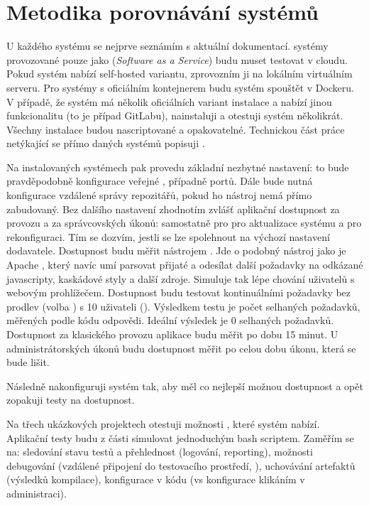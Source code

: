 \section{Metodika porovnávání \CICD systémů}
    U každého systému se nejprve seznámím s aktuální dokumentací. \CICD systémy provozované pouze jako  (\textit{Software as a Service}) budu muset testovat v cloudu. Pokud systém nabízí self-hosted variantu, zprovozním ji na lokálním virtuálním serveru. Pro systémy s oficiálním kontejnerem budu systém spouštět v Dockeru. V případě, že systém má několik oficiálních variant instalace a nabízí jinou funkcionalitu (to je případ GitLabu), nainstaluji a otestuji systém několikrát. Všechny instalace budou nascriptované a opakovatelné. Technickou část práce netýkající se přímo daných \CICD systémů popisuji .

    Na instalovaných systémech pak provedu základní nezbytné nastavení: to bude pravděpodobně konfigurace veřejné , případně portů. Dále bude nutná konfigurace vzdálené správy repozitářů, pokud ho \CICD nástroj nemá přímo zabudovaný. Bez dalšího nastavení zhodnotím zvlášť aplikační dostupnost za provozu a za správcovských úkonů: samostatně pro pro aktualizace \CI systému a pro rekonfiguraci. Tím se dozvím, jestli se lze spolehnout na výchozí nastavení dodavatele. Dostupnost budu měřit nástrojem  \cite{fulmer-siege}. Jde o podobný nástroj jako je Apache  \cite{apache-ab}, který navíc umí parsovat přijaté  a odesílat další požadavky na odkázané javascripty, kaskádové styly a další zdroje. Simuluje tak lépe chování uživatelů s webovým prohlížečem. Dostupnost budu testovat kontinuálními požadavky bez prodlev (volba ) s 10 uživateli (). Výsledkem testu je počet selhaných požadavků, měřených podle \HTTP kódu odpovědi. Ideální výsledek je 0 selhaných požadavků. Dostupnost za klasického provozu aplikace budu měřit po dobu 15 minut. U administrátorských úkonů budu dostupnost měřit po celou dobu úkonu, která se bude lišit.

    Následně nakonfiguruji systém tak, aby měl co nejlepší možnou dostupnost a opět zopakuji testy na dostupnost.

    Na třech ukázkových projektech otestuji možnosti \CI, které systém nabízí. Aplikační testy budu z části simulovat jednoduchým bash scriptem.  Zaměřím se na: sledování stavu testů a přehlednost (logování, reporting), možnosti debugování (vzdálené připojení do testovacího prostředí, ), uchovávání artefaktů (výsledků kompilace), konfigurace v kódu (vs konfigurace klikáním v administraci).

